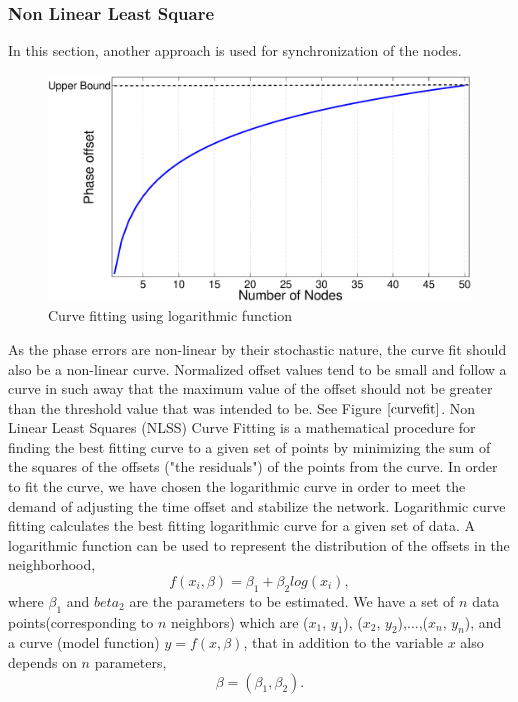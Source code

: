 \documentclass[a4paper,10pt]{report}
\begin{document}
\subsubsection{Non Linear Least Square}
In this section, another approach is used for synchronization of the nodes.
\newline
\begin{figure}
\centering
\includegraphics[width=0.75 \textwidth]{curvefit}
\caption{Curve fitting using logarithmic function} \label{curvefit}
\end{figure}
As the phase errors are non-linear by their stochastic nature, the curve fit should also be a non-linear curve. Normalized offset values tend to be small and follow a curve in such away that the maximum value of the offset should not be greater than the threshold value that was intended to be. See Figure $\ref{curvefit}$. 
\newline
Non Linear Least Squares (NLSS) Curve Fitting  is a mathematical procedure for finding the best fitting curve to a given set of points by minimizing the sum of the squares of the offsets ("the residuals") of the points from the curve. In order to fit the curve, we have chosen the logarithmic curve in order to meet the demand of adjusting the time offset and stabilize the network. Logarithmic
curve fitting calculates the best fitting logarithmic curve for a given set of data. A logarithmic function can be used to represent
the distribution of the offsets in the neighborhood, 
\begin{equation}
 f(x_i,\beta)= \beta _1 + \beta_2log(x_i),
\end{equation}
where $\beta_1$ and $beta_2$ are the parameters to be estimated.\newline
We have a set of $n$ data points(corresponding to $n$ neighbors) which are ($x_1$, $y_1$), ($x_2$, $y_2$),$\dots$,($x_n$, $y_n$), and a curve (model function) $y= f(x, \beta)$, that in addition to the variable $x$ also depends on $n$ parameters,
\begin{equation}
\beta = (\beta_1, \beta_2).
\end{equation}
\end{document}
